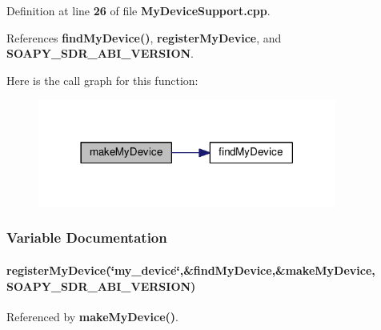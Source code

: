 Definition at line {\bf 26} of file {\bf My\+Device\+Support.\+cpp}.



References {\bf find\+My\+Device()}, {\bf register\+My\+Device}, and {\bf S\+O\+A\+P\+Y\+\_\+\+S\+D\+R\+\_\+\+A\+B\+I\+\_\+\+V\+E\+R\+S\+I\+ON}.



Here is the call graph for this function\+:
\nopagebreak
\begin{figure}[H]
\begin{center}
\leavevmode
\includegraphics[width=278pt]{dc/d9d/MyDeviceSupport_8cpp_a4cf461c9e7b6b53d8ed0245444882139_cgraph}
\end{center}
\end{figure}




\subsubsection{Variable Documentation}
\paragraph[{register\+My\+Device}]{ register\+My\+Device(\char`\"{}my\+\_\+device\char`\"{},\&find\+My\+Device,\&{\bf make\+My\+Device}, {\bf S\+O\+A\+P\+Y\+\_\+\+S\+D\+R\+\_\+\+A\+B\+I\+\_\+\+V\+E\+R\+S\+I\+ON})\hspace{0.3cm}{\ttfamily [static]}}\label{MyDeviceSupport_8cpp_ae9eae12b75cedf362a5deaa1cfe4e20d}


Referenced by {\bf make\+My\+Device()}.

